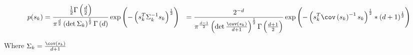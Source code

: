 \documentclass{amsproc}
\begin{document}
 
\begin{align}
    p(s_k)  &= \frac{ \frac{1}{2} \Gamma \left( \frac{d}{2} \right) }{\pi ^{\frac{d}{2}} \left( \det \Sigma _k \right) ^ {\frac{1}{2}} \Gamma \left( d \right) } \exp \left( - \left( s_k^T \Sigma_k^{-1} s_k \right) ^{\frac{1}{2}} \right)
            &= \frac{2^{-d}}{ \pi^{\frac{d-1}{2}} \left( \det \frac{ \cov \left(s_k\right)}{d+1} \right)^{\frac{1}{2}} \Gamma \left( \frac{d+1}{2} \right) } \exp \left( - \left( s_k^T \cov \left(s_k\right)^{-1}s_k\right)^{\frac{1}{2}} * \left(d+1\right)^{\frac{1}{2}} \right)
\end{align}

Where $\Sigma_k = \frac{\cov \left(s_k\right)}{d+1}$
\end{document}

